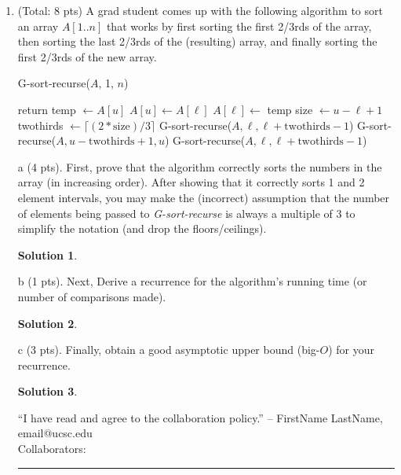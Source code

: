 \documentclass[11pt]{article}
\newtheorem*{solution}{Solution}
\begin{document}
\begin{enumerate}
\item (Total: 8 pts) A grad student comes up with the following algorithm to sort an array $A[1..n]$ that works by first sorting the first 2/3rds of the array, then sorting the last 2/3rds of the (resulting) array,
and finally sorting the first 2/3rds of the new array.

\begin{algorithmic}[1]
 
	\State G-sort-recurse($A$, 1, $n$)
\EndFunction

	\State return 
 
	 
		\State  temp $\gets A[u]$
		\State $A[u] \gets A[\ell]$
		\State $A[\ell] \gets$ temp
	\EndIf
\Else {}
\State size $\gets u - \ell + 1$
\State twothirds $\gets \lceil (2 * \mbox{size})  / 3 \rceil$
\State G-sort-recurse($A, \ell, \ell + \mbox{twothirds} - 1$)
\State G-sort-recurse($A, u - \mbox{twothirds}+1 , u$)
\State G-sort-recurse($A, \ell, \ell + \mbox{twothirds} - 1$)
\EndIf 
\EndFunction
\end{algorithmic}

a (4 pts). First, prove that the algorithm correctly sorts the numbers in the array (in increasing order).  
After showing that it correctly sorts 1 and 2 element intervals, you may make the (incorrect) assumption that the number of elements being passed to \emph{G-sort-recurse} is always a multiple of 3 to simplify the notation (and drop the floors/ceilings). 
\begin{solution}
\end{solution}
\newpage

b (1 pts). Next, Derive a recurrence for the algorithm's running time (or number of comparisons made).
\begin{solution}
\end{solution}
\newpage

c (3 pts). Finally, obtain a good asymptotic upper bound (big-$O$) for your recurrence.  
\begin{solution}
\end{solution}
\newpage
“I have read and agree to the collaboration policy.” -- FirstName LastName, email@ucsc.edu
\\
Collaborators: %
\\
\hrule



\end{enumerate}
\end{document}
